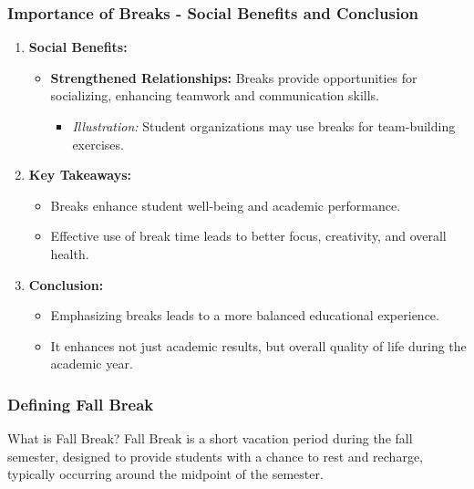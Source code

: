 \documentclass[aspectratio=169]{beamer}
\begin{document}
\begin{frame}[fragile]
    \frametitle{Importance of Breaks - Social Benefits and Conclusion}
    \begin{enumerate}
        \item \textbf{Social Benefits:}
        \begin{itemize}
            \item \textbf{Strengthened Relationships:} Breaks provide opportunities for socializing, enhancing teamwork and communication skills.
            \begin{itemize}
                \item \textit{Illustration:} Student organizations may use breaks for team-building exercises.
            \end{itemize}
        \end{itemize}
        
        \item \textbf{Key Takeaways:}
        \begin{itemize}
            \item Breaks enhance student well-being and academic performance.
            \item Effective use of break time leads to better focus, creativity, and overall health.
        \end{itemize}
        
        \item \textbf{Conclusion:}
        \begin{itemize}
            \item Emphasizing breaks leads to a more balanced educational experience.
            \item It enhances not just academic results, but overall quality of life during the academic year.
        \end{itemize}
    \end{enumerate}
\end{frame}

\begin{frame}[fragile]
    \frametitle{Defining Fall Break}
    \begin{block}{What is Fall Break?}
        Fall Break is a short vacation period during the fall semester, designed to provide students with a chance to rest and recharge, typically occurring around the midpoint of the semester.
    \end{block}
\end{frame}
\end{document}

